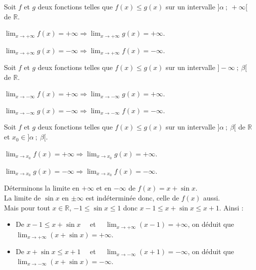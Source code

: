 \documentclass{cornouaille}
\begin{document}
\begin{theoreme}
Soit $f$ et $g$ deux fonctions telles que $f(x)\leqslant g(x)$ sur un intervalle $]\alpha~;~+\infty[$ de $\mathbb{R}$.
\begin{colitemize}{2}
\item $\lim_{x\to+\infty} f(x)=+\infty\Rightarrow\lim_{x\to+\infty} g(x)=+\infty$.
\item $\lim_{x\to+\infty} g(x)=-\infty\Rightarrow\lim_{x\to+\infty} f(x)=-\infty$.
\end{colitemize}



Soit $f$ et $g$ deux fonctions telles que $f(x)\leqslant g(x)$ sur un intervalle $]-\infty~;~\beta[$ de $\mathbb{R}$.

\begin{colitemize}{2}
\item $\lim_{x\to-\infty} f(x)=+\infty\Rightarrow\lim_{x\to-\infty} g(x)=+\infty$.
\item $\lim_{x\to-\infty} g(x)=-\infty\Rightarrow\lim_{x\to-\infty} f(x)=-\infty$.
\end{colitemize}



Soit $f$ et $g$ deux fonctions telles que $f(x)\leqslant g(x)$ sur un intervalle $]\alpha~;~\beta[$ de $\mathbb{R}$  et $x_0\in]\alpha~;~\beta[$.

\begin{colitemize}{2}
\item $\lim_{x\to x_0} f(x)=+\infty\Rightarrow\lim_{x\to x_0} g(x)=+\infty$.
\item $\lim_{x\to x_0} g(x)=-\infty\Rightarrow\lim_{x\to x_0} f(x)=-\infty$.
\end{colitemize}
\end{theoreme}


\begin{exemple}
Déterminons la limite en $+\infty$ et en $-\infty$ de $f(x)=x+\sin x$.\\
La limite de $\sin x$ en $\pm \infty$ est indéterminée donc, celle de $f(x)$ aussi.\\
Mais pour tout $x\in\mathbb{R}$, $-1\leqslant\sin x\leqslant 1$ donc $x-1\leqslant x+\sin x\leqslant x+1$. Ainsi :
\begin{itemize}
\item De $x-1\leqslant x+\sin x$ ~~et~~ $\lim_{x\to +\infty} (x-1)=+\infty$, on déduit que $\lim_{x\to +\infty} (x+\sin x)=+\infty$.
\item De $x+\sin x\leqslant x+1$ ~~et~~ $\lim_{x\to -\infty} (x+1)=-\infty$, on déduit que $\lim_{x\to -\infty} (x+\sin x)=-\infty$.
\end{itemize}


\end{exemple}
\end{document}
